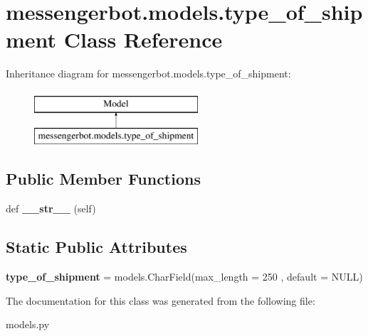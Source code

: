 \hypertarget{classmessengerbot_1_1models_1_1type__of__shipment}{}\section{messengerbot.\+models.\+type\+\_\+of\+\_\+shipment Class Reference}
\label{classmessengerbot_1_1models_1_1type__of__shipment}
Inheritance diagram for messengerbot.\+models.\+type\+\_\+of\+\_\+shipment\+:\begin{figure}[H]
\begin{center}
\leavevmode
\includegraphics[height=2.000000cm]{classmessengerbot_1_1models_1_1type__of__shipment}
\end{center}
\end{figure}
\subsection*{Public Member Functions}
\begin{DoxyCompactItemize}
\item 
\mbox{\label{classmessengerbot_1_1models_1_1type__of__shipment_ad991877bb87d7bca5e8c0bae090c145e}} 
def {\bfseries \+\_\+\+\_\+str\+\_\+\+\_\+} (self)
\end{DoxyCompactItemize}
\subsection*{Static Public Attributes}
\begin{DoxyCompactItemize}
\item 
\mbox{\label{classmessengerbot_1_1models_1_1type__of__shipment_a679547579bf080f1baee36b9f974ca3f}} 
{\bfseries type\+\_\+of\+\_\+shipment} = models.\+Char\+Field(max\+\_\+length = 250 , default = \textquotesingle{}N\+U\+LL\textquotesingle{})
\end{DoxyCompactItemize}


The documentation for this class was generated from the following file\+:\begin{DoxyCompactItemize}
\item 
models.\+py\end{DoxyCompactItemize}
